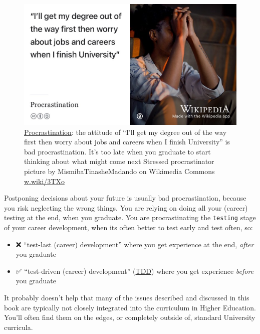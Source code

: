 \documentclass[
]{book}
\providecommand{\tightlist}{%
  \setlength{\itemsep}{0pt}\setlength{\parskip}{0pt}}
\begin{document}
\begin{figure}

{\centering \includegraphics[width=0.99\linewidth]{images/procrastinator} 

}

\caption{\href{https://en.wikipedia.org/wiki/Procrastination}{Procrastination}: the attitude of ``I'll get my degree out of the way first then worry about jobs and careers when I finish University'' is bad procrastination. It's too late when you graduate to start thinking about what might come next \citep{procrastination} Stressed procrastinator picture by MismibaTinasheMadando on Wikimedia Commons \href{https://w.wiki/3TXo}{w.wiki/3TXo}}\label{fig:procrastination-fig}
\end{figure}



Postponing decisions about your future is usually bad procrastination, because you risk neglecting the wrong things. You are relying on doing all your (career) testing at the end, when you graduate. You are procrastinating the \texttt{testing} stage of your career development, when its often better to test early and test often, so:

\begin{itemize}
\tightlist
\item
  ❌ ``test-last (career) development'' where you get experience at the end, \emph{after} you graduate
\item
  ✅ ``test-driven (career) development'' (\href{https://en.wikipedia.org/wiki/Test-driven_development}{TDD}) where you get experience \emph{before} you graduate
\end{itemize}

It probably doesn't help that many of the issues described and discussed in this book are typically not closely integrated into the curriculum in Higher Education. You'll often find them on the edges, or completely outside of, standard University curricula.
\end{document}
